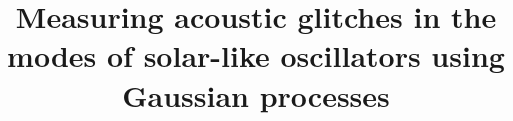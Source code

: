 \documentclass[linenumbers,modern,astrosymb,times]{aastex631}
\begin{document}
\title{
    Measuring acoustic glitches in the modes of solar-like oscillators
    using Gaussian processes
}


\end{document}
